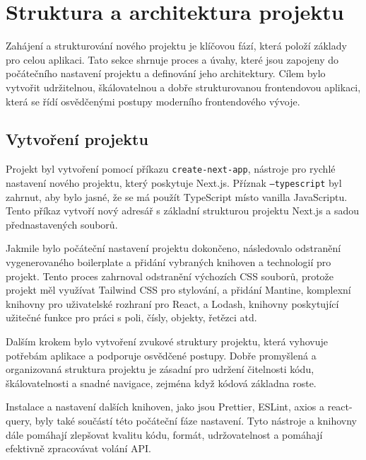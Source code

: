 \section{Struktura a architektura projektu}
\label{sec:implementace-architektura}
Zahájení a strukturování nového projektu je klíčovou fází, která položí základy pro celou aplikaci.
Tato sekce shrnuje proces a úvahy, které jsou zapojeny do počátečního nastavení projektu a definování jeho architektury.
Cílem bylo vytvořit udržitelnou, škálovatelnou a dobře strukturovanou frontendovou aplikaci, která se řídí osvědčenými postupy moderního frontendového vývoje.

\subsection{Vytvoření projektu}
\label{sec:implementace-architektura-vytvoreni-projektu}
Projekt byl vytvoření pomocí příkazu \texttt{create-next-app}, nástroje pro rychlé nastavení nového projektu, který poskytuje Next.js.
Příznak \texttt{--typescript} byl zahrnut, aby bylo jasné, že se má použít TypeScript místo vanilla JavaScriptu.
Tento příkaz vytvoří nový adresář s základní strukturou projektu Next.js a sadou přednastavených souborů.

Jakmile bylo počáteční nastavení projektu dokončeno, následovalo odstranění vygenerovaného boilerplate a přidání vybraných knihoven a technologií pro projekt.
Tento proces zahrnoval odstranění výchozích CSS souborů, protože projekt měl využívat Tailwind CSS pro stylování, a přidání Mantine, komplexní knihovny pro uživatelské rozhraní pro React, a Lodash, knihovny poskytující užitečné funkce pro práci s poli, čísly, objekty, řetězci atd.

Dalším krokem bylo vytvoření zvukové struktury projektu, která vyhovuje potřebám aplikace a podporuje osvědčené postupy.
Dobře promyšlená a organizovaná struktura projektu je zásadní pro udržení čitelnosti kódu, škálovatelnosti a snadné navigace, zejména když kódová základna roste.

Instalace a nastavení dalších knihoven, jako jsou Prettier, ESLint, axios a react-query, byly také součástí této počáteční fáze nastavení.
Tyto nástroje a knihovny dále pomáhají zlepšovat kvalitu kódu, formát, udržovatelnost a pomáhají efektivně zpracovávat volání API.

